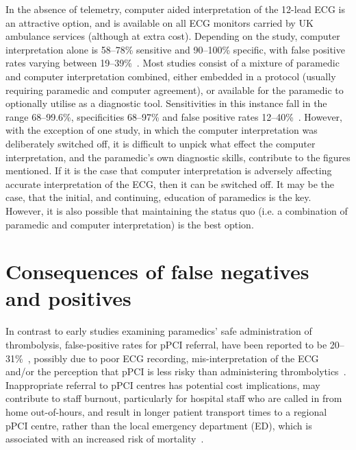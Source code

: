 In the absence of telemetry, computer aided interpretation of the 12-lead ECG is an attractive option, and is available on all ECG monitors carried by UK ambulance services (although at extra cost). Depending on the study, computer interpretation alone is 58--78\% sensitive and 90--100\% specific, with false positive rates varying between 19--39\%~\citep{bhalla_prehospital_2013,clark_automated_2010,youngquist_comparison_2008}. Most studies consist of a mixture of paramedic and computer interpretation combined, either embedded in a protocol (usually requiring paramedic and computer agreement), or available for the paramedic to optionally utilise as a diagnostic tool. Sensitivities in this instance fall in the range 68--99.6\%, specificities 68--97\% and false positive rates 12--40\%~\citep{cantor_prehospital_2012,ducas_transmit_2012,ioannidis_accuracy_2001,mixon_retrospective_2012,ting_abstract_2009,young_paramedics_2011}. However, with the exception of one study, in which the computer interpretation was deliberately switched off, it is difficult to unpick what effect the computer interpretation, and the paramedic's own diagnostic skills, contribute to the figures mentioned. If it is the case that computer interpretation is adversely affecting accurate interpretation of the ECG, then it can be switched off. It may be the case, that the initial, and continuing, education of paramedics is the key. However, it is also possible that maintaining the status quo (i.e. a combination of paramedic and computer interpretation) is the best option. 

\section{Consequences of false negatives and positives}
\label{consequencesoffalsenegativesandpositives}

In contrast to early studies examining paramedics' safe administration of thrombolysis, false-positive rates for pPCI referral, have been reported to be 20--31\%~\citep{young_paramedics_2011,davis_positive_2007,rokos_appropriate_2010,swan_factors_2009}, possibly due to poor ECG recording, mis-interpretation of the ECG and\slash or the perception that pPCI is less risky than administering thrombolytics~\citep{smith_st-elevation_2001}. Inappropriate referral to pPCI centres has potential cost implications, may contribute to staff burnout, particularly for hospital staff who are called in from home out-of-hours, and result in longer patient transport times to a regional pPCI centre, rather than the local emergency department (ED), which is associated with an increased risk of mortality~\citep{nicholl_relationship_2007}.

